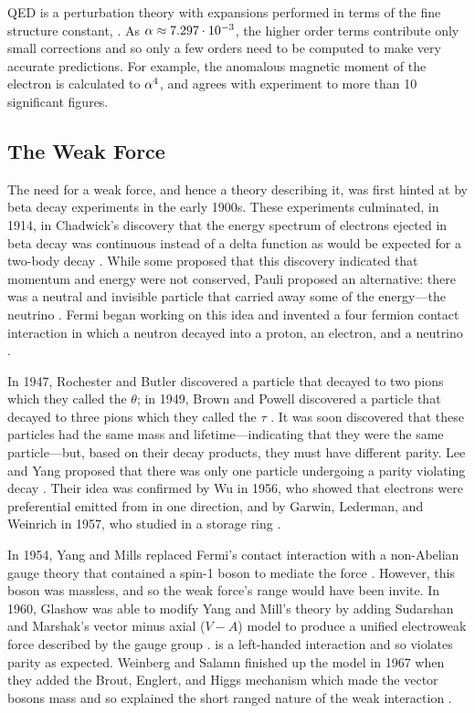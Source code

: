 QED is a perturbation theory with expansions performed in terms of the fine
structure constant, \fsc. As $\alpha \approx 7.297 \cdot 10^{-3}$, the higher
order terms contribute only small corrections and so only a few orders need to
be computed to make very accurate predictions. For example, the anomalous
magnetic moment of the electron is calculated to $\alpha^{4}$, and agrees with
experiment to more than 10 significant figures.

\subsection{The Weak Force}
\label{subsection:weak_force}

The need for a weak force, and hence a theory describing it, was first hinted
at by beta decay experiments in the early 1900s. These experiments culminated,
in 1914, in Chadwick's discovery that the energy spectrum of electrons ejected
in beta decay was continuous instead of a delta function as would be expected
for a two-body decay \cite{chadwick1914}. While some proposed that this
discovery indicated that momentum and energy were not conserved, Pauli proposed
an alternative: there was a neutral and invisible particle that carried away
some of the energy---the neutrino \cite{pauli1930}. Fermi began working on this
idea and invented a four fermion contact interaction in which a neutron decayed
into a proton, an electron, and a neutrino \cite{fermi1934}.

In 1947, Rochester and Butler discovered a particle that decayed to two pions
which they called the $\theta$; in 1949, Brown and Powell discovered a particle
that decayed to three pions which they called the $\tau$
\cite{Rochester1947}\cite{brown1949}. It was soon discovered that these
particles had the same mass and lifetime---indicating that they were the same
particle---but, based on their decay products, they must have different parity.
Lee and Yang proposed that there was only one particle undergoing a parity
violating decay \cite{lee1956}. Their idea was confirmed by Wu in 1956, who
showed that electrons were preferential emitted from \cobaltsixty in one
direction, and by Garwin, Lederman, and Weinrich in 1957, who studied \pitomunu
in a storage ring \cite{wu1956}\cite{garwin1957}.

In 1954, Yang and Mills replaced Fermi's contact interaction with a non-Abelian
gauge theory that contained a spin-1 boson to mediate the force
\cite{yang1954}. However, this boson was massless, and so the weak force's
range would have been invite. In 1960, Glashow was able to modify Yang and
Mill's theory by adding Sudarshan and Marshak's vector minus axial ($V-A$)
model to produce a unified electroweak force described by the \SUtwoUone gauge
group \cite{glashow1961}\cite{sudarshan1958}. \SUtwo is a left-handed
interaction and so violates parity as expected. Weinberg and Salamn finished up
the model in 1967 when they added the Brout, Englert, and Higgs mechanism which
made the vector bosons mass and so explained the short ranged nature of the
weak interaction
\cite{weinberg1967}\cite{salam1968}\cite{englert1964}\cite{higgs1964}.

